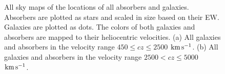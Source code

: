 \documentclass[twocolumn,tighten]{aastex62}
\newcommand{\kms}{$\rm km\, s^{-1}$}
\begin{document}
\begin{figure}[ht!]
\vspace{-1pt}
\centering
  \label{allsky_2500}
  \label{allsky_5000}
  \caption{\small{All sky maps of the locations of all absorbers and galaxies. Absorbers are plotted as stars and scaled in size based on their EW. Galaxies are plotted as dots. The colors of both galaxies and absorbers are mapped to their heliocentric velocities. (a) All galaxies and absorbers in the velocity range $450 \leq cz \leq 2500$ \kms. (b) All galaxies and absorbers in the velocity range $2500 < cz \leq 5000$ \kms.}}
\vspace{-1pt}
\label{allsky_2500-5000}
\end{figure}
\end{document}

